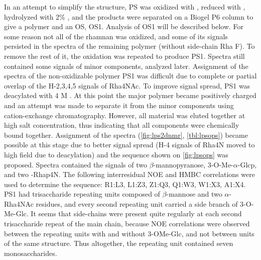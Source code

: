 		In an attempt to simplify the structure, \ac{PS} was oxidized with , reduced with , hydrolyzed with 2\% , and the products were separated on a Biogel P6 column to give a polymer and an \ac{OS}, \ac{OS}1. Analysis of \ac{OS}1 will be described below. For some reason not all of the rhamnan was oxidized, and some of its signals persisted in the spectra of the remaining polymer (without side-chain Rha F). To remove the rest of it, the oxidation was repeated to produce \ac{PS}1. Spectra still contained some signals of minor components, analyzed later. Assignment of the spectra of the non-oxidizable polymer \ac{PS}1 was difficult due to complete or partial overlap of the H-2,3,4,5 signals of Rha4NAc. To improve signal spread, \ac{PS}1 was deacylated with 4 M . At this point the major polymer became positively charged and an attempt was made to separate it from the minor components using cation-exchange chromatography. However, all material was eluted together at high salt concentration, thus indicating that all components were chemically bound together. Assignment of the spectra (\cref{fig:lps2dnmr}, \cref{tbl:lpsops}) became possible at this stage due to better signal spread (H-4 signals of Rha4N moved to high field due to deacylation) and the sequence shown on \cref{fig:lpsops} was proposed. Spectra contained the signals of two $\beta$-mannopyranose, 3-O-Me-$\alpha$-Glcp, and two -Rhap4N. The following interresidual \ac{NOE} and \ac{HMBC} correlations were used to determine the sequence: R1:L3, L1:Z3, Z1:Q3, Q1:W3, W1:X3, A1:X4. \Ac{PS}1 had trisaccharide repeating units composed of $\beta$-mannose and two $\alpha$-Rha4NAc residues, and every second repeating unit carried a side branch of 3-O-Me-Glc. It seems that side-chains were present quite regularly at each second trisaccharide repeat of the main chain, because \ac{NOE} correlations were observed between the repeating units with and without 3-OMe-Glc, and not between units of the same structure. Thus altogether, the repeating unit contained seven monosaccharides.


